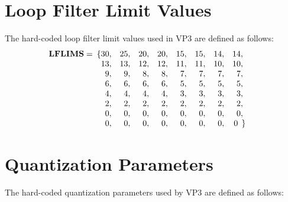 \documentclass[9pt,letterpaper]{book}
\newcommand{\bitvar}[1]{\ensuremath{\mathbf{\bm{#1}}}}
\numberwithin{equation}{chapter}
\numberwithin{figure}{chapter}
\numberwithin{table}{chapter}
\begin{document}
\section{Loop Filter Limit Values}
\label{app:vp3-loop-filter-limits}

The hard-coded loop filter limit values used in VP3 are defined as follows:
\begin{align*}
\bitvar{LFLIMS} = & \begin{array}[t]{r@{}rrrrrrrr@{}l}
\{ & 30, & 25, & 20, & 20, & 15, & 15, & 14, & 14,   &      \\
   & 13, & 13, & 12, & 12, & 11, & 11, & 10, & 10,   &      \\
   &  9, &  9, &  8, &  8, &  7, &  7, &  7, &  7,   &      \\
   &  6, &  6, &  6, &  6, &  5, &  5, &  5, &  5,   &      \\
   &  4, &  4, &  4, &  4, &  3, &  3, &  3, &  3,   &      \\
   &  2, &  2, &  2, &  2, &  2, &  2, &  2, &  2,   &      \\
   &  0, &  0, &  0, &  0, &  0, &  0, &  0, &  0,   &      \\
   &  0, &  0, &  0, &  0, &  0, &  0, &  0, &  0\;\ & \!\} \\
\end{array}
\end{align*}

\section{Quantization Parameters}
\label{app:vp3-quant-params}

The hard-coded quantization parameters used by VP3 are defined as follows:
\end{document}
